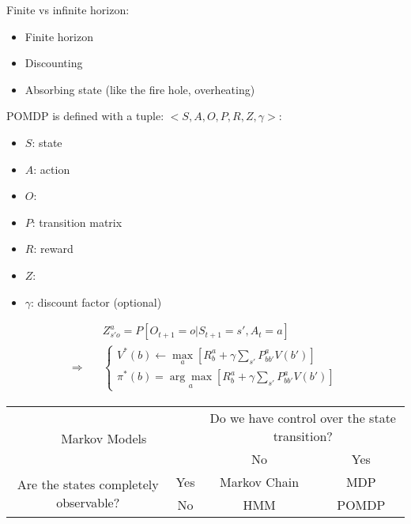 Finite \ac{vs} infinite horizon: \todo{}

\begin{itemize}
	\item Finite horizon
	\item Discounting
	\item Absorbing state (like the fire hole, overheating)
\end{itemize}

\ac{POMDP} is defined with a tuple: $<S, A, O, P, R, Z, \gamma>$:
\begin{itemize}
	\item $S$: state
	\item $A$: action
	\item $O$: 
	\item $P$: transition matrix
	\item $R$: reward
	\item $Z$: 
	\item $\gamma$: discount factor (optional)
\end{itemize}
\begin{align}	
	&Z_{s'o}^a = P \left[ O_{t+1} =o | S_{t+1} = s', A_t = a \right]\\
	\Rightarrow \quad &\begin{cases}
		\displaystyle V^*(b) \leftarrow \underset{a}{\max}\left[ R_b^a + \gamma \sum_{s'} P_{bb'}^a V(b') \right]\\
		\displaystyle \pi^*(b) = \underset{a}{\arg\max} \left[ R_b^a + \gamma \sum_{s'} P_{bb'}^a V(b') \right]
	\end{cases}
\end{align}

\begin{table}[hbt!]
	\begin{tabular}{|c|c||c|c|}
		\hline
		\multicolumn{2}{|c||}{\multirow{2}{*}{Markov Models}} & \multicolumn{2}{c|}{Do we have control over the state transition?} \\ \cline{3-4}
		\multicolumn{2}{|c||}{} & No & Yes \\ \hline\hline
		\multirow{2}{*}{Are the states completely observable?} & Yes & Markov Chain & \ac{MDP} \\ \cline{2-4}
		& No & \ac{HMM} & \ac{POMDP} \\ \hline
	\end{tabular}
\end{table}

